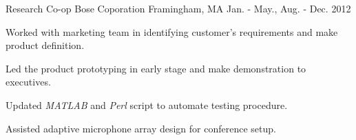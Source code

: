 \begin{cventries}
  \cventry
    {Research Co-op} %
    {Bose Coporation} %
    {Framingham, MA} %
    {Jan. - May., Aug. - Dec. 2012} %
    {
      \begin{cvitems} %
        \item {Worked with marketing team in identifying customer's requirements and make product definition.}
        \item {Led the product prototyping in early stage and make demonstration to executives.}
        \item {Updated \textit{MATLAB} and \textit{Perl} script to automate testing procedure.}
        \item {Assisted adaptive microphone array design for conference setup.}
      \end{cvitems}
    }

\end{cventries}
